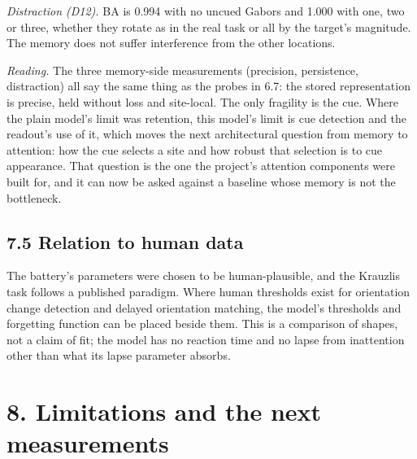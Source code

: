 \documentclass[

]{article}
\begin{document}
\emph{Distraction (D12).} BA is 0.994 with no uncued Gabors and 1.000 with one, two or three, whether they rotate as in the real task or all by the target's magnitude. The memory does not suffer interference from the other locations.



\emph{Reading.} The three memory-side measurements (precision, persistence, distraction) all say the same thing as the probes in 6.7: the stored representation is precise, held without loss and site-local. The only fragility is the cue. Where the plain model's limit was retention, this model's limit is cue detection and the readout's use of it, which moves the next architectural question from memory to attention: how the cue selects a site and how robust that selection is to cue appearance. That question is the one the project's attention components were built for, and it can now be asked against a baseline whose memory is not the bottleneck.



\subsection{7.5 Relation to human data}\label{relation-to-human-data}



The battery's parameters were chosen to be human-plausible, and the Krauzlis task follows a published paradigm. Where human thresholds exist for orientation change detection and delayed orientation matching, the model's thresholds and forgetting function can be placed beside them. This is a comparison of shapes, not a claim of fit; the model has no reaction time and no lapse from inattention other than what its lapse parameter absorbs.



\section{8. Limitations and the next measurements}\label{limitations-and-the-next-measurements}
\end{document}
